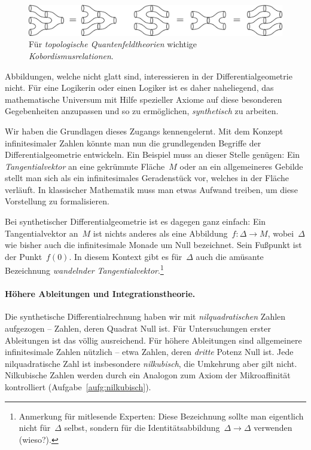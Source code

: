 \documentclass[twoside]{../zirkelblatt}
\theoremstyle{definition}
\theoremstyle{plain}
\theoremstyle{remark}
\begin{document}
\begin{figure}[b]
  \centering
  \includegraphics[scale=0.4]{cobordism}
  \caption{\label{fig:cobordism}Für \emph{topologische Quantenfeldtheorien}
  wichtige \emph{Kobordismusrelationen}.}
\end{figure}

Abbildungen, welche nicht glatt sind, interessieren in der
Differentialgeometrie nicht. Für eine Logikerin oder einen Logiker ist es daher
naheliegend, das mathematische Universum mit Hilfe spezieller Axiome auf diese
besonderen Gegebenheiten anzupassen und so zu ermöglichen, \emph{synthetisch}
zu arbeiten.

Wir haben die Grundlagen dieses Zugangs kennengelernt. Mit dem Konzept
infinitesimaler Zahlen könnte man nun die grundlegenden Begriffe der
Differentialgeometrie entwickeln. Ein Beispiel muss an dieser Stelle genügen:
Ein \emph{Tangentialvektor} an eine gekrümmte Fläche~$M$ oder an ein allgemeineres
Gebilde stellt man sich als ein infinitesimales Geradenstück vor, welches in
der Fläche verläuft. In klassischer Mathematik muss man etwas Aufwand treiben,
um diese Vorstellung zu formalisieren.

Bei synthetischer Differentialgeometrie ist es dagegen ganz einfach: Ein
Tangentialvektor an~$M$ ist nichts anderes als eine Abbildung~$f : \Delta \to M$,
wobei~$\Delta$ wie bisher auch die in\-fi\-ni\-te\-si\-ma\-le Monade um Null bezeichnet.
Sein Fußpunkt ist der Punkt~$f(0)$. In diesem Kontext gibt es für~$\Delta$
auch die amüsante Bezeichnung \emph{wandelnder Tangentialvektor}.\footnote{Anmerkung für
mitlesende Experten: Diese Bezeichnung sollte man eigentlich nicht für~$\Delta$
selbst, sondern für die Identitätsabbildung~$\Delta \to \Delta$ verwenden
(wieso?).}


\paragraph{Höhere Ableitungen und Integrationstheorie.}
Die synthetische Differentialrechnung haben wir mit \emph{nilquadratischen}
Zahlen aufgezogen -- Zahlen, deren Quadrat Null ist. Für Untersuchungen erster
Ableitungen ist das völlig ausreichend. Für höhere Ableitungen sind
allgemeinere infinitesimale Zahlen nützlich -- etwa Zahlen, deren \emph{dritte} Potenz
Null ist. Jede nilquadratische Zahl ist insbesondere \emph{nilkubisch}, die
Umkehrung aber gilt nicht. Nilkubische Zahlen werden durch ein Analogon zum
Axiom der Mikroaffinität kontrolliert (Aufgabe~\ref{aufg:nilkubisch}).
\end{document}
